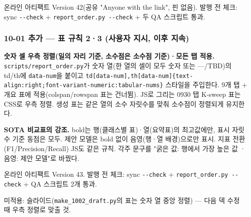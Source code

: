 \par\noindent \textbullet\enspace 온라인 아티팩트 Version 42(공유 "Anyone with the link", 핀 없음). 발행 전 체크: sync \texttt{-\allowbreak{}-\allowbreak{}check} +\allowbreak{} \texttt{report\_\allowbreak{}\allowbreak{}o\allowbreak{}rder.\allowbreak{}py \allowbreak{}-\allowbreak{}-\allowbreak{}check} +\allowbreak{} 두 QA 스크립트 통과.


\subsubsection{10-01 추가 — 표 규칙 2·3 (사용자 지시, 이후 지속)}
\par\noindent \textbullet\enspace \textbf{숫자 셀 우측 정렬(일의 자리 기준, 소수점은 소수점 기준)·모든 탭 적용.} \texttt{scripts/\allowbreak{}\allowbreak{}report\_\allowbreak{}\allowbreak{}o\allowbreak{}rder.\allowbreak{}py}가 숫자 열(한 열의 셀이 모두 숫자 또는 —/\allowbreak{}TBD)의 td/\allowbreak{}th에 \texttt{data-\allowbreak{}num\allowbreak{}}을 붙이고 \texttt{td[data-\allowbreak{}num],\allowbreak{}th[\allowbreak{}data-\allowbreak{}num\allowbreak{}]\{\allowbreak{}text-\allowbreak{}a\allowbreak{}lign:rig\allowbreak{}ht;font-\allowbreak{}variant-\allowbreak{}numeric:\allowbreak{}tabular-\allowbreak{}nums\}\allowbreak{}} 스타일을 주입한다. 9개 탭 +\allowbreak{} 개요 표에 적용(colspan/\allowbreak{}rowspan 표는 건너뜀). JS로 그리는 0930 탭 K-sweep 표는 CSS로 우측 정렬. 생성 표는 같은 열의 소수 자릿수를 맞춰 소수점이 정렬되게 유지한다.


\par\noindent \textbullet\enspace \textbf{SOTA 비교표의 강조.} bold는 행(클래스별 표)·열(요약표)의 최고값에만, 표시 자릿수 기준 동점은 모두. 제안 모델은 bold 없이 음영(행·열 배경)으로만 표시. 지표 전환(F1/\allowbreak{}Precision/\allowbreak{}Recall) JS도 같은 규칙. 각주 문구를 "굵은 값: 행에서 가장 높은 값 · 음영: 제안 모델"로 바꿨다.


\par\noindent \textbullet\enspace 온라인 아티팩트 Version 43. 발행 전 체크: sync \texttt{-\allowbreak{}-\allowbreak{}check} +\allowbreak{} \texttt{report\_\allowbreak{}\allowbreak{}o\allowbreak{}rder.\allowbreak{}py \allowbreak{}-\allowbreak{}-\allowbreak{}check} +\allowbreak{} QA 스크립트 2개 통과.


\par\noindent \textbullet\enspace 미적용: 슬라이드(\texttt{make\_\allowbreak{}\allowbreak{}100\allowbreak{}2\_\allowbreak{}\allowbreak{}draft.\allowbreak{}py}의 표는 숫자 열 중앙 정렬) — 다음 덱 수정 때 우측 정렬로 맞출 것.


